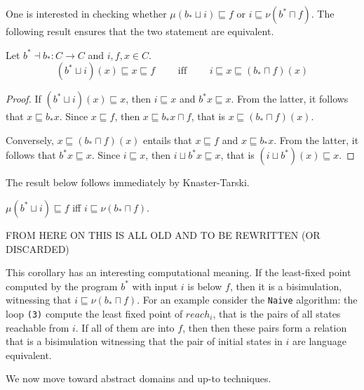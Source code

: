 \documentclass{llncs}
\begin{document}
One is interested in checking whether $\mu (b_*\sqcup i) \sqsubseteq f$ or $i \sqsubseteq \nu (b^* \sqcap f)$. The following result ensures that the two statement are equivalent.
%
\begin{proposition}\label{prop:correspondencefixedpoints}Let $b^* \dashv b_* \colon C \to C$ and $i,f,x\in C$. 
$$(b^*\sqcup i)(x) \sqsubseteq x \sqsubseteq f \qquad \text{ iff } \qquad 
i \sqsubseteq x \sqsubseteq (b_*\sqcap f) (x)$$
\end{proposition}
\begin{proof}
If $(b^*\sqcup i)(x) \sqsubseteq x$, then $ i \sqsubseteq x$ and $b^*x\sqsubseteq x$. From the latter, it follows that $x\sqsubseteq b_* x$. 
%
Since $x\sqsubseteq f$, then  $x\sqsubseteq b_* x \sqcap f$, that is $x\sqsubseteq (b_* \sqcap f)(x)$.

Conversely, $x \sqsubseteq (b_*\sqcap f)(x)$ entails that $x\sqsubseteq f$ and $x \sqsubseteq b_*x$. From the latter, it follows that $b^*x\sqsubseteq x$. 
%
Since $i\sqsubseteq x$, then $i\sqcup b^*x \sqsubseteq x$, that is $(i \sqcup b^*)(x) \sqsubseteq x$.
\end{proof}

The result below follows immediately by Knaster-Tarski.

\begin{corollary}
$\mu (b^*\sqcup i)\sqsubseteq f$ iff $i \sqsubseteq \nu (b_*\sqcap f) $.
\end{corollary}

FROM HERE ON THIS IS ALL OLD AND TO BE REWRITTEN (OR DISCARDED)

This corollary has an interesting computational meaning. If the least-fixed point computed by the program $b^*$ with input $i$ is below $f$, then it is a bisimulation, witnessing that $i\sqsubseteq  \nu (b_*\sqcap f)$. For an example consider the \texttt{Naive} algorithm:  the loop \texttt{(3)} compute the least fixed point of $reach_i$, that is the pairs of all states reachable from $i$. If all of them are into $f$, then then  these pairs form a relation that is a bisimulation witnessing that the pair of initial states in $i$ are language equivalent.

We now move toward abstract domains and up-to techniques.
\end{document}

